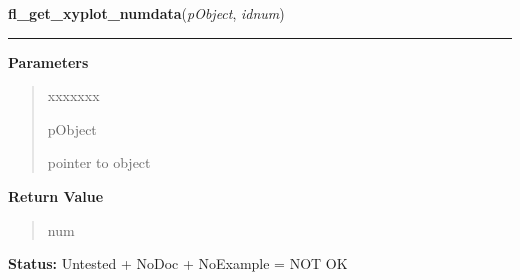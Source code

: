 \hspace{.8\funcindent}\begin{boxedminipage}{\funcwidth}

    \raggedright \textbf{fl\_get\_xyplot\_numdata}(\textit{pObject}, \textit{idnum})

    \vspace{-1.5ex}

    \rule{\textwidth}{0.5\fboxrule}
\setlength{\parskip}{2ex}
\setlength{\parskip}{1ex}
      \textbf{Parameters}
      \vspace{-1ex}

      \begin{quote}
        \begin{Ventry}{xxxxxxx}

          \item[pObject]

          pointer to object

        \end{Ventry}

      \end{quote}

      \textbf{Return Value}
    \vspace{-1ex}

      \begin{quote}
      num

      \end{quote}

\textbf{Status:} Untested + NoDoc + NoExample = NOT OK



    \end{boxedminipage}

    \label{xformslib:library:fl_set_xyplot_fontsize}

    \vspace{0.5ex}

